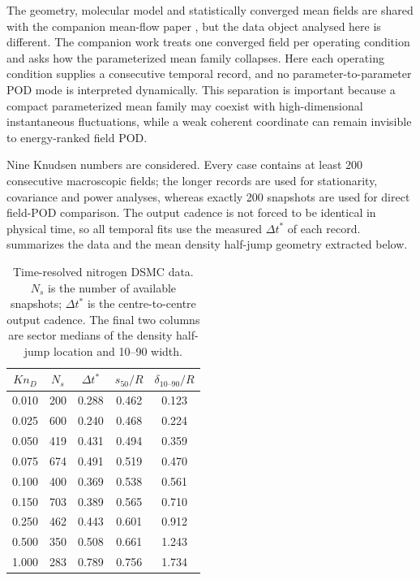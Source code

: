 \documentclass[paper]{JFM-FLM_Au}
\newcommand{\KnD}{Kn_D}
\newcommand{\tstar}{t^*}
\newcommand{\scenter}{s_{50}}
\newcommand{\deltaten}{\delta_{10\text{--}90}}
\begin{document}
The geometry, molecular model and statistically converged mean fields are shared with the companion mean-flow paper \citep{RoohiShoja2026Mean}, but the data object analysed here is different. The companion work treats one converged field per operating condition and asks how the parameterized mean family collapses. Here each operating condition supplies a consecutive temporal record, and no parameter-to-parameter POD mode is interpreted dynamically. This separation is important because a compact parameterized mean family may coexist with high-dimensional instantaneous fluctuations, while a weak coherent coordinate can remain invisible to energy-ranked field POD.

Nine Knudsen numbers are considered. Every case contains at least 200 consecutive macroscopic fields; the longer records are used for stationarity, covariance and power analyses, whereas exactly 200 snapshots are used for direct field-POD comparison. The output cadence is not forced to be identical in physical time, so all temporal fits use the measured $\Delta \tstar$ of each record.  summarizes the data and the mean density half-jump geometry extracted below.

\begin{table}
\centering
\caption{Time-resolved nitrogen DSMC data. $N_s$ is the number of available snapshots; $\Delta \tstar$ is the centre-to-centre output cadence. The final two columns are sector medians of the density half-jump location and 10--90 width.}
\label{tab:data}
\small
\begin{tabular}{ccccc}
\toprule
$\KnD$ & $N_s$ & $\Delta \tstar$ & $\scenter/R$ & $\deltaten/R$ \\
\midrule
0.010 & 200 & 0.288 & 0.462 & 0.123 \\
0.025 & 600 & 0.240 & 0.468 & 0.224 \\
0.050 & 419 & 0.431 & 0.494 & 0.359 \\
0.075 & 674 & 0.491 & 0.519 & 0.470 \\
0.100 & 400 & 0.369 & 0.538 & 0.561 \\
0.150 & 703 & 0.389 & 0.565 & 0.710 \\
0.250 & 462 & 0.443 & 0.601 & 0.912 \\
0.500 & 350 & 0.508 & 0.661 & 1.243 \\
1.000 & 283 & 0.789 & 0.756 & 1.734 \\
\bottomrule
\end{tabular}
\end{table}
\end{document}
